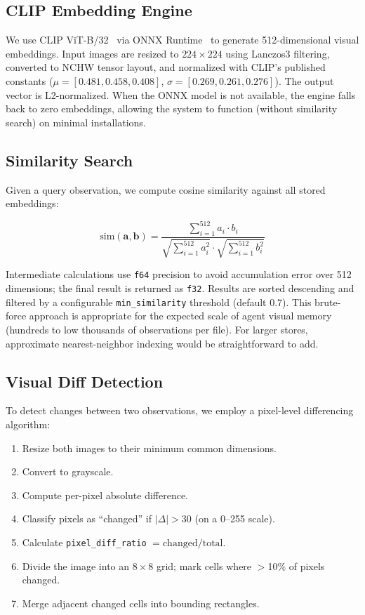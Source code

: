 \documentclass[10pt, twocolumn]{article}
\begin{document}
\subsection{CLIP Embedding Engine}

We use CLIP ViT-B/32~\cite{radford2021clip} via ONNX Runtime~\cite{onnxruntime} to generate 512-dimensional visual embeddings. Input images are resized to $224 \times 224$ using Lanczos3 filtering, converted to NCHW tensor layout, and normalized with CLIP's published constants ($\mu = [0.481, 0.458, 0.408]$, $\sigma = [0.269, 0.261, 0.276]$). The output vector is L2-normalized. When the ONNX model is not available, the engine falls back to zero embeddings, allowing the system to function (without similarity search) on minimal installations.

\subsection{Similarity Search}

Given a query observation, we compute cosine similarity against all stored embeddings:

\begin{equation}
\text{sim}(\mathbf{a}, \mathbf{b}) = \frac{\sum_{i=1}^{512} a_i \cdot b_i}{\sqrt{\sum_{i=1}^{512} a_i^2} \cdot \sqrt{\sum_{i=1}^{512} b_i^2}}
\label{eq:cosine}
\end{equation}

Intermediate calculations use \texttt{f64} precision to avoid accumulation error over 512 dimensions; the final result is returned as \texttt{f32}. Results are sorted descending and filtered by a configurable \texttt{min\_similarity} threshold (default 0.7). This brute-force approach is appropriate for the expected scale of agent visual memory (hundreds to low thousands of observations per file). For larger stores, approximate nearest-neighbor indexing would be straightforward to add.

\subsection{Visual Diff Detection}

To detect changes between two observations, we employ a pixel-level differencing algorithm:

\begin{enumerate}[nosep,leftmargin=*]
\item Resize both images to their minimum common dimensions.
\item Convert to grayscale.
\item Compute per-pixel absolute difference.
\item Classify pixels as ``changed'' if $|\Delta| > 30$ (on a 0--255 scale).
\item Calculate \texttt{pixel\_diff\_ratio} $= \text{changed} / \text{total}$.
\item Divide the image into an $8 \times 8$ grid; mark cells where $>$10\% of pixels changed.
\item Merge adjacent changed cells into bounding rectangles.
\end{enumerate}
\end{document}
